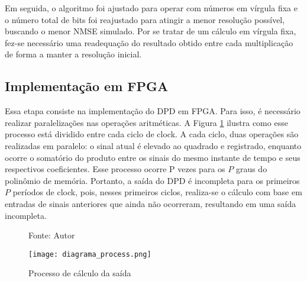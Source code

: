 Em seguida, o algoritmo foi ajustado para operar com números em vírgula fixa e o número total de bits foi reajustado para atingir a menor resolução possível, buscando o menor NMSE simulado. Por se tratar de um cálculo em vírgula fixa, fez-se necessário uma readequação do resultado obtido entre cada multiplicação de forma a manter a resolução inicial.

\subsection{Implementação em FPGA}
Essa etapa consiste na implementação do DPD em FPGA. Para isso, é necessário realizar paralelizações nas operações aritméticas. A Figura \ref{fig:diagramaprocess} ilustra como esse processo está dividido entre cada ciclo de clock. A cada ciclo, duas operações são realizadas em paralelo: o sinal atual é elevado ao quadrado e registrado, enquanto ocorre o somatório do produto entre os sinais do mesmo instante de tempo e seus respectivos coeficientes. Esse processo ocorre P vezes para os \( P \) graus do polinômio de memória. Portanto, a saída do DPD é incompleta para os primeiros \( P \) períodos de clock, pois, nesses primeiros ciclos, realiza-se o cálculo com base em entradas de sinais anteriores que ainda não ocorreram, resultando em uma saída incompleta.

\begin{figure}[ht!]
  \centering
  \captionsetup{justification=centering}
  \caption*{Fonte: Autor}
  \texttt{[image: diagrama\_process.png]}
  \caption{Processo de cálculo da saída}
  \label{fig:diagramaprocess}
\end{figure}
  
